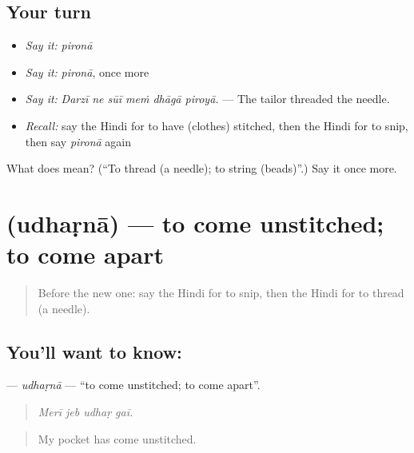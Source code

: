 \subsection*{Your turn}
\begin{itemize}
\raggedright
  \item \emph{Say it:} \emph{pironā}
  \item \emph{Say it:} \emph{pironā}, once more
  \item \emph{Say it:} \emph{Darzī ne sūī meṁ dhāgā piroyā.} — The tailor threaded the needle.
  \item \emph{Recall:} say the Hindi for to have (clothes) stitched, then the Hindi for to snip, then say \emph{pironā} again
\end{itemize}

\begin{tcolorbox}[breakable,colback=teal!4,colframe=teal!35!black,title={Before you move on}]
What does  mean? (\textquotedblleft{}To thread (a needle); to string (beads)\textquotedblright{}.) Say it once more.
\end{tcolorbox}
\section[\texorpdfstring{\hi{उधड़ना} (udhaṛnā)}{उधड़ना (udhaṛnā)}]{ (udhaṛnā) — to come unstitched; to come apart}

\label{lesson:HI-C513-udharna}



\begin{quote}
Before the new one: say the Hindi for to snip, then the Hindi for to thread (a needle).
\end{quote}

\subsection*{You'll want to know: }
\textbf{} — \emph{udhaṛnā} — \textquotedblleft{}to come unstitched; to come apart\textquotedblright{}.

\begin{quote}
   
\end{quote}

\begin{quote}
\emph{Merī jeb udhaṛ gaī.}
\end{quote}

\begin{quote}
My pocket has come unstitched.
\end{quote}

